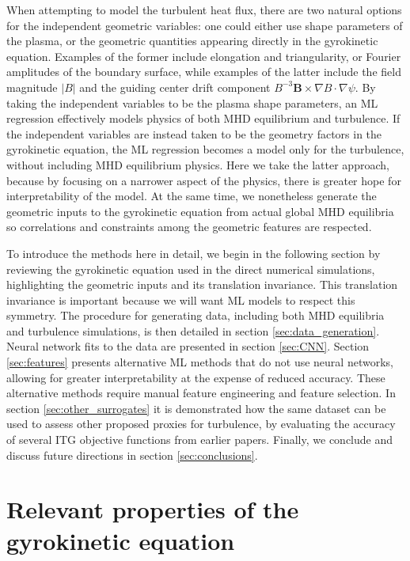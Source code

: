 \documentclass{jpp}
\begin{document}
When attempting to model the turbulent heat flux, there are two natural options for the independent geometric variables: one could either use shape parameters of the plasma, or the geometric quantities appearing directly in the gyrokinetic equation. Examples of the former include elongation and triangularity, or Fourier amplitudes of the boundary surface, while examples of the latter include the field magnitude $|B|$ and the guiding center drift component $B^{-3}\mathbf{B}\times\nabla B \cdot\nabla\psi$.
By taking the independent variables to be the plasma shape parameters, an ML regression effectively models physics of both MHD equilibrium and turbulence.
If the independent variables are instead taken to be the geometry factors in the gyrokinetic equation, the ML regression becomes a model only for the turbulence, without including MHD equilibrium physics.
Here we take the latter approach, because by focusing on a narrower aspect of the physics, there is greater hope for interpretability of the model.
At the same time, we nonetheless generate the geometric inputs to the gyrokinetic equation from actual global MHD equilibria so correlations and constraints among the geometric features are respected.

To introduce the methods here in detail, we begin in the following section by reviewing the gyrokinetic equation used in the direct numerical simulations, highlighting the geometric inputs and its translation invariance.
This translation invariance is important because we will want ML models to respect this symmetry. 
The procedure for generating data, including both MHD equilibria and turbulence simulations, is then detailed in section \ref{sec:data_generation}.
Neural network fits to the data are presented in section \ref{sec:CNN}.
Section \ref{sec:features} presents alternative ML methods that do not use neural networks, allowing for greater interpretability at the expense of reduced accuracy.
These alternative methods require manual feature engineering and feature selection.
In section \ref{sec:other_surrogates} it is demonstrated how the same dataset can be used to assess other proposed proxies for turbulence, by evaluating the accuracy of several ITG objective functions from earlier papers.
Finally, we conclude and discuss future directions in section \ref{sec:conclusions}.



\section{Relevant properties of the gyrokinetic equation}
\label{sec:GKE}
\end{document}
